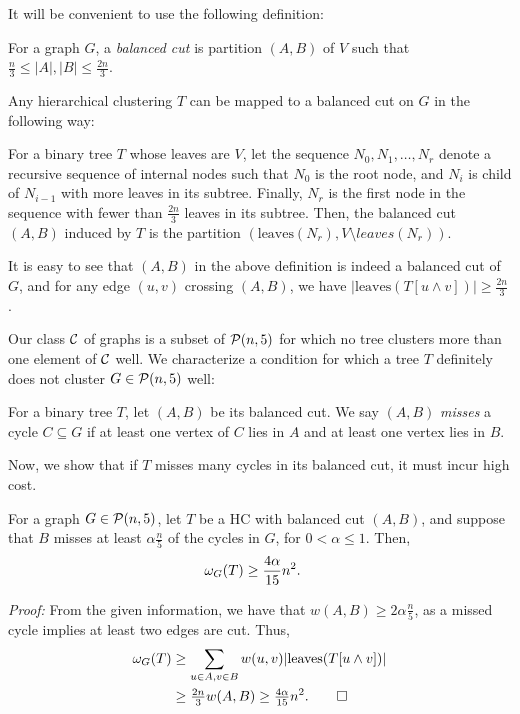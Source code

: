 It will be convenient to use the following definition:
\begin{defn}
For a graph $G$, a \emph{balanced cut} is partition $(A,B)$ of $V$ such that $\frac{n}{3} \leq |A|, |B| \leq \frac{2n}{3}$.
\end{defn}
Any hierarchical clustering $T$ can be mapped to a balanced cut on $G$ in the following way:
\begin{defn}
For a binary tree $T$ whose leaves are $V$, let the sequence $N_0, N_1, \ldots, N_r$ denote a recursive sequence of internal nodes such that $N_0$ is the root node, and $N_i$ is child of $N_{i-1}$ with more leaves in its subtree. Finally, $N_r$ is the first node in the sequence with fewer than $\frac{2n}{3}$ leaves in its subtree. Then, the balanced cut $(A,B)$ induced by $T$ is the partition $(\text{leaves}(N_r), V \setminus{leaves}(N_r))$.
\end{defn}
It is easy to see that $(A,B)$ in the above definition is indeed a balanced cut of $G$, and for any edge $(u,v)$ crossing $(A,B)$, we have $|\text{leaves}(T[u \wedge v])| \geq \frac{2n}{3}$.

Our class $\mathcal{C}$ of graphs is a subset of $\mathcal{P}(n,5)$ for which no tree clusters more than one element of $\mathcal{C}$ well. We characterize a condition for which a tree $T$ definitely does not cluster $G \in \mathcal{P}(n,5)$ well:

\begin{defn}
    For a binary tree $T$, let $(A,B)$ be its balanced cut. We say $(A,B)$ \emph{misses} a cycle $C \subseteq G$ if at least one vertex of $C$ lies in $A$ and at least one vertex lies in $B$.
\end{defn}
Now, we show that if $T$ misses many cycles in its balanced cut, it must incur high cost.

\begin{lem}\label{lem:clique-miss-bad}
    For a graph $G \in \mathcal{P}(n,5)$, let $T$ be a HC with balanced cut $(A,B)$, and suppose that $B$ misses at least $\alpha \frac{n}{5}$ of the cycles in $G$, for $0 < \alpha \leq 1$. Then,
    \begin{align*}
        \omega_G(T) &\geq \frac{4\alpha}{15} n^2.
    \end{align*}
\end{lem}
\noindent \textit{Proof:}
From the given information, we have that $w(A,B) \geq 2 \alpha \frac{n}{5}$, as a missed cycle implies at least two edges are cut. Thus,
\begin{align*}
    \omega_G(T) &\geq \sum_{u \in A, v \in B} w(u,v) |\text{leaves}(T[u \wedge v])| \\
    &\geq \tfrac{2n}{3} w(A,B) \geq \tfrac{4\alpha }{15} n^2. \qed
\end{align*} 

